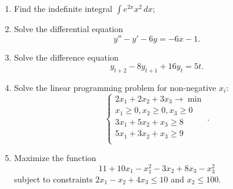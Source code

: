\documentclass[12pt,a4paper]{article}
\begin{document}
\thispagestyle{empty}



\begin{enumerate}

\item Find the indefinite integral $\int {{e^{2x}} x^2 \, dx}$;

\item Solve the differential equation
\[
y'' - y' - 6y = -6x-1.
\]

\item Solve the difference equation
\[
{y_{t + 2}} - 8{y_{t + 1}} + 16{y_t} = 5t.
\]
\item Solve the linear programming problem for non-negative $x_i$:
\[
\begin{cases}
2x_1 + 2x_2 + 3x_3 \to \min \\
x_1 \geq 0, x_2 \geq 0, x_3 \geq 0 \\
3x_1 + 5x_2 + x_3 \geq 8 \\
5x_1 + 3x_2 + x_3 \geq 9 \\
\end{cases}.
\]

\item Maximize the function
\[
11 + 10x_1 - x_1^2 -3x_2 + 8x_3 - x_3^2
\]
subject to constraints $2x_1 -x_2+4x_3 \leq 10$ and $x_2 \leq 100$.

\end{enumerate}
\end{document}
